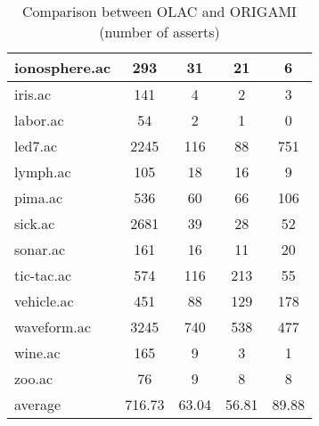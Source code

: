 \begin{table}[htbp]
\begin{tabular}{|l|c|c|c|c|}
		\hline
		ionosphere.ac   & 293           & 31                 & 21                       & 6                             \\
		\hline
		iris.ac         & 141           & 4                  & 2                        & 3                             \\
		\hline
		labor.ac        & 54            & 2                  & 1                        & 0                             \\
		\hline
		led7.ac         & 2245          & 116                & 88                       & 751                           \\
		\hline
		lymph.ac        & 105           & 18                 & 16                       & 9                             \\
		\hline
		pima.ac         & 536           & 60                 & 66                       & 106                           \\
		\hline
		sick.ac         & 2681          & 39                 & 28                       & 52                            \\
		\hline
		sonar.ac        & 161           & 16                 & 11                       & 20                            \\
		\hline
		tic-tac.ac      & 574           & 116                & 213                      & 55                            \\
		\hline
		vehicle.ac      & 451           & 88                 & 129                      & 178                           \\
		\hline
		waveform.ac     & 3245          & 740                & 538                      & 477                           \\
		\hline
		wine.ac         & 165           & 9                  & 3                        & 1                             \\
		\hline
		zoo.ac          & 76            & 9                  & 8                        & 8                             \\
		\hline
		average         & 716.73        & 63.04              & 56.81                    & 89.88                         \\
		\hline
		\end{tabular}
	\caption{Comparison between OLAC and ORIGAMI (number of asserts)}
	\label{tab:comparison_olac_origami}
\end{table}